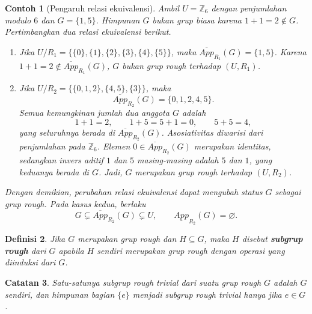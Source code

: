 \documentclass[a4paper,11pt]{article}
\theoremstyle{plain}
\newtheorem{definisi}{Definisi}
\newtheorem{contoh}[definisi]{Contoh}
\newtheorem{catatan}[definisi]{Catatan}
\newcommand{\Z}{\mathbb{Z}}
\begin{document}
\begin{contoh}[Pengaruh relasi ekuivalensi]\label{ex:relasi-grup}
      Ambil $U=\Z_6$ dengan penjumlahan modulo $6$ dan $G=\{1,5\}$.
      Himpunan $G$ bukan grup biasa karena $1+1=2\notin G$.
      Pertimbangkan dua relasi ekuivalensi berikut.
      \begin{enumerate}
            \item Jika $U/R_1=\{\{0\},\{1\},\{2\},\{3\},\{4\},\{5\}\}$,
                  maka $\overline{App}_{R_1}(G)=\{1,5\}$.
                  Karena $1+1=2\notin\overline{App}_{R_1}(G)$,
                  $G$ bukan grup rough terhadap $(U,R_1)$.

            \item Jika $U/R_2=\{\{0,1,2\},\{4,5\},\{3\}\}$, maka
                  \[
                        \overline{App}_{R_2}(G)=\{0,1,2,4,5\}.
                  \]
                  Semua kemungkinan jumlah dua anggota $G$ adalah
                  \[
                        1+1=2,\qquad 1+5=5+1=0,\qquad 5+5=4,
                  \]
                  yang seluruhnya berada di $\overline{App}_{R_2}(G)$.
                  Asosiativitas diwarisi dari penjumlahan pada $\Z_6$.
                  Elemen $0\in\overline{App}_{R_2}(G)$ merupakan identitas,
                  sedangkan invers aditif $1$ dan $5$ masing-masing adalah
                  $5$ dan $1$, yang keduanya berada di $G$.
                  Jadi, $G$ merupakan grup rough terhadap $(U,R_2)$.
      \end{enumerate}
      Dengan demikian, perubahan relasi ekuivalensi dapat mengubah
      status $G$ sebagai grup rough. Pada kasus kedua, berlaku
      \[
            G\subsetneq\overline{App}_{R_2}(G)\subsetneq U,
            \qquad \underline{App}_{R_2}(G)=\varnothing.
      \]
\end{contoh}


\begin{definisi}\label{def:8}
      Jika $G$ merupakan grup rough dan $H\subseteq G$, maka $H$ disebut
      \textbf{subgrup rough} dari $G$ apabila $H$ sendiri merupakan grup
      rough dengan operasi yang diinduksi dari $G$.
\end{definisi}

\begin{catatan}\label{rem:9}
      Satu-satunya subgrup rough trivial dari suatu grup rough $G$ adalah
      $G$ sendiri, dan himpunan bagian $\{e\}$ menjadi subgrup rough trivial
      hanya jika $e\in G$.
\end{catatan}
\end{document}
